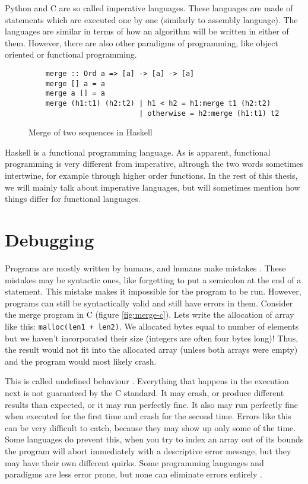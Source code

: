 Python and C are so called imperative languages. These languages are 
made of statements which are executed one by one (similarly to assembly language).
The languages are similar in terms of how an algorithm will be written in either of them.
However, there are also other paradigms of programming, like object oriented or functional programming.

\begin{figure}[H]
    \begin{verbatim}
    merge :: Ord a => [a] -> [a] -> [a]
    merge [] a = a
    merge a [] = a
    merge (h1:t1) (h2:t2) | h1 < h2 = h1:merge t1 (h2:t2)
                          | otherwise = h2:merge (h1:t1) t2
    \end{verbatim}
    \caption{Merge of two sequences in Haskell}
\end{figure}

Haskell is a functional programming language. As is apparent, functional programming is very different from imperative,
altrough the two words sometimes intertwine, for example through higher order functions. In the rest of this thesis, we will
mainly talk about imperative languages, but will sometimes mention how things differ for functional languages.

\section{Debugging}
Programs are mostly written by humans, and humans make mistakes \cite{human-error}. These mistakes may be syntactic ones, like
forgetting to put a semicolon at the end of a statement. This mistake makes it impossible for the program to be run. However,
programs can still be syntactically valid and still have errors in them. Consider the merge program in C (figure \ref{fig:merge-c}).
Lets write the allocation of array like this: \texttt{malloc(len1 + len2)}. We allocated bytes equal to number of elements
but we haven't incorporated their size (integers are often four bytes long)! Thus, the result would not fit into the allocated
array (unless both arrays were empty) and the program would most likely crash.

This is called undefined behaviour \cite{undefined-behavior}.
Everything that happens in the execution next is not guaranteed by the C standard. It may crash, or produce different
results than expected, or it may run perfectly fine. It also may run perfectly fine
when executed for the first time and crash for the second time.
Errors like this can be very difficult to catch, because they may show up only some of the time. Some languages do prevent this,
when you try to index an array out of its bounds the program will abort immediately with a descriptive error message,
but they may have their own different quirks. Some programming languages and paradigms are less error prone, but none 
can eliminate errors entirely \cite{bugs-by-language, bugs-by-language-2}.

